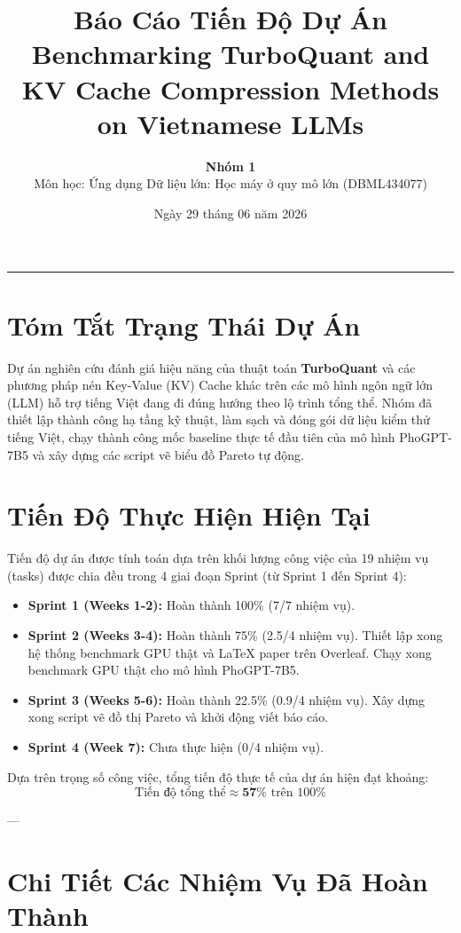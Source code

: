 \documentclass[a4paper,12pt]{article}
\title{\textbf{Báo Cáo Tiến Độ Dự Án \\ Benchmarking TurboQuant and KV Cache Compression Methods on Vietnamese LLMs}}
\author{\textbf{Nhóm 1} \\ Môn học: Ứng dụng Dữ liệu lớn: Học máy ở quy mô lớn (DBML434077)}
\date{Ngày 29 tháng 06 năm 2026}
\begin{document}
\maketitle

\hrule
\vspace{0.5cm}

\section{Tóm Tắt Trạng Thái Dự Án}
Dự án nghiên cứu đánh giá hiệu năng của thuật toán \textbf{TurboQuant} và các phương pháp nén Key-Value (KV) Cache khác trên các mô hình ngôn ngữ lớn (LLM) hỗ trợ tiếng Việt đang đi đúng hướng theo lộ trình tổng thể. Nhóm đã thiết lập thành công hạ tầng kỹ thuật, làm sạch và đóng gói dữ liệu kiểm thử tiếng Việt, chạy thành công mốc baseline thực tế đầu tiên của mô hình PhoGPT-7B5 và xây dựng các script vẽ biểu đồ Pareto tự động.

\section{Tiến Độ Thực Hiện Hiện Tại}
Tiến độ dự án được tính toán dựa trên khối lượng công việc của 19 nhiệm vụ (tasks) được chia đều trong 4 giai đoạn Sprint (từ Sprint 1 đến Sprint 4):
\begin{itemize}
    \item \textbf{Sprint 1 (Weeks 1-2):} Hoàn thành 100\% (7/7 nhiệm vụ).
    \item \textbf{Sprint 2 (Weeks 3-4):} Hoàn thành 75\% (2.5/4 nhiệm vụ). Thiết lập xong hệ thống benchmark GPU thật và LaTeX paper trên Overleaf. Chạy xong benchmark GPU thật cho mô hình PhoGPT-7B5.
    \item \textbf{Sprint 3 (Weeks 5-6):} Hoàn thành 22.5\% (0.9/4 nhiệm vụ). Xây dựng xong script vẽ đồ thị Pareto và khởi động viết báo cáo.
    \item \textbf{Sprint 4 (Week 7):} Chưa thực hiện (0/4 nhiệm vụ).
\end{itemize}

Dựa trên trọng số công việc, tổng tiến độ thực tế của dự án hiện đạt khoảng:
\begin{equation*}
    \text{Tiến độ tổng thể} \approx \mathbf{57\%} \text{ trên } 100\%
\end{equation*}

---

\section{Chi Tiết Các Nhiệm Vụ Đã Hoàn Thành}
\end{document}
